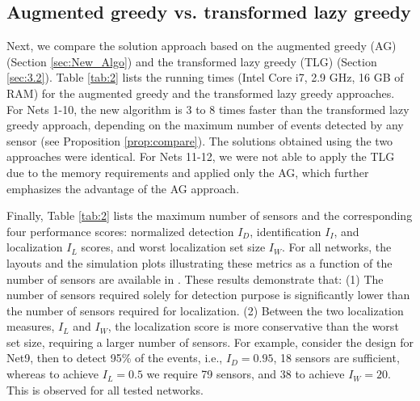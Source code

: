 \documentclass[twocolumn]{autart}
\begin{document}
\subsection{Augmented greedy vs. transformed lazy greedy}\vspace{-0.35cm} \label{sec:app}
Next, we compare the solution approach based on the augmented greedy (AG) (Section \ref{sec:New_Algo}) and the transformed lazy greedy (TLG) (Section \ref{sec:3.2}). Table \ref{tab:2} lists the running times (Intel Core i7, 2.9 GHz, 16 GB of RAM) for the augmented greedy and the transformed lazy greedy approaches. For Nets 1-10, the new algorithm is $3$ to $8$ times faster than the transformed lazy greedy approach, depending on the maximum number of events detected by any sensor (see Proposition \ref{prop:compare}). The solutions obtained using the two approaches were identical. {For Nets 11-12, we were not able to apply the TLG due to the memory requirements and applied only the AG, which further emphasizes the advantage of the AG approach.}\vspace{-0.15cm}

Finally, Table \ref{tab:2} lists the maximum number of sensors and the corresponding four performance scores: normalized detection $I_D$, identification $I_I$, and localization $I_L$ scores, and worst localization set size $I_W$. For all networks, the layouts and the simulation plots illustrating these metrics as a function of the number of sensors are available in \cite{perelman2015}. These results demonstrate that: (1) The number of sensors required solely for detection purpose is significantly lower than the number of sensors required for localization. 
(2) Between the two localization measures, $I_L$ and $I_W$, the localization score is more conservative than the worst set size, requiring a larger number of sensors.  
For example, consider the design for Net9, then to detect 95\% of the events, i.e., $I_D = 0.95$, 18 sensors are sufficient, whereas to achieve $I_L = 0.5$ we require 79 sensors, and 38 to achieve $I_W = 20$. This is observed for all tested networks. 
\end{document}
